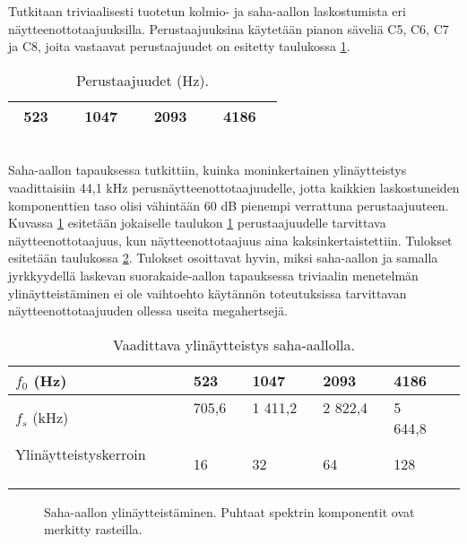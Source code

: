 \documentclass[finnish,12pt,a4paper,pdftex]{article} %
\begin{document}
Tutkitaan triviaalisesti tuotetun kolmio- ja saha-aallon laskostumista eri näytteenottotaajuuksilla. Perustaajuuksina käytetään pianon säveliä C5, C6, C7 ja C8, joita vastaavat perustaajuudet on esitetty taulukossa \ref{kolmiosim}. \\
\begin{table}[h]
\centering
\caption{Perustaajuudet (Hz).}
\label{kolmiosim}
{\setlength{\tabcolsep}{4mm}
\begin{tabular}{|c|c|c|c|}
\hline
\ 523 \ & \ 1047 \ & \ 2093 \  & \ 4186 \ \\ \hline
\end{tabular}} \vspace{3mm}
\end{table} \\
Saha-aallon tapauksessa tutkittiin, kuinka moninkertainen ylinäytteistys vaadittaisiin 44,1 kHz perusnäytteenottotaajuudelle, jotta kaikkien laskostuneiden komponenttien taso olisi vähintään 60 dB pienempi verrattuna perustaajuuteen. Kuvassa \ref{fig:sahasimulaatio} esitetään jokaiselle taulukon \ref{kolmiosim} perustaajuudelle tarvittava näytteenottotaajuus, kun näytteenottotaajuus aina kaksinkertaistettiin. Tulokset esitetään taulukossa \ref{sahasimulointi}. Tulokset osoittavat hyvin, miksi saha-aallon ja samalla jyrkkyydellä laskevan suorakaide-aallon tapauksessa triviaalin menetelmän ylinäytteistäminen ei ole vaihtoehto käytännön toteutuksissa tarvittavan näytteenottotaajuuden ollessa useita megahertsejä. \\
\vspace{2mm}
\begin{table}[h]
\begin{center}
\caption{Vaadittava ylinäytteistys saha-aallolla.}
\label{sahasimulointi}
{\setlength{\tabcolsep}{4mm}
\begin{tabular}{@{}llllll@{}}
\toprule
$f_0$ (Hz)  & 523 & 1047 & 2093 & 4186 &  \\  \midrule
$f_s$ (kHz)  & 705,6 \  & 1 411,2 \ & 2 822,4 \  & 5 644,8 &  \\  \midrule
Ylinäytteistyskerroin \ \ \ \  & 16 & 32 & 64 & 128 &  \\  \bottomrule
\end{tabular}}
\end{center}
\end{table}
\begin{figure}[ht] 
\begin{center}
\caption{Saha-aallon ylinäytteistäminen. Puhtaat spektrin komponentit ovat merkitty rasteilla.}
\label{fig:sahasimulaatio}
\end{center}
\end{figure} \\
\end{document}
